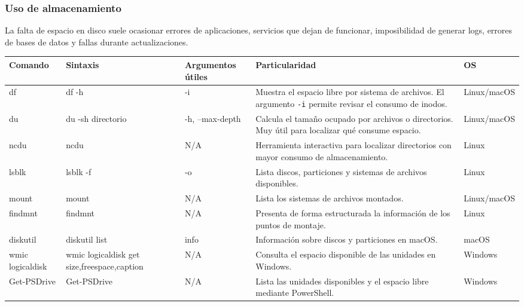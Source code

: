 \documentclass[a4paper,10pt]{article}
\begin{document}

\subsubsection{Uso de almacenamiento}

La falta de espacio en disco suele ocasionar errores de aplicaciones,
servicios que dejan de funcionar, imposibilidad de generar logs,
errores de bases de datos y fallas durante actualizaciones.

\begin{longtable}{|p{2.8cm}|p{3cm}|p{4cm}|p{5.6cm}|p{1.5cm}|}

\hline
Comando &
Sintaxis &
Argumentos útiles &
Particularidad &
OS
\\
\hline
\endhead

df &
df -h &
-i &
Muestra el espacio libre por sistema de archivos. El argumento \texttt{-i} permite revisar el consumo de inodos. &
Linux/macOS
\\
\hline

du &
du -sh directorio &
-h, --max-depth &
Calcula el tamaño ocupado por archivos o directorios. Muy útil para localizar qué consume espacio. &
Linux/macOS
\\
\hline

ncdu &
ncdu &
N/A &
Herramienta interactiva para localizar directorios con mayor consumo de almacenamiento. &
Linux
\\
\hline

lsblk &
lsblk -f &
-o &
Lista discos, particiones y sistemas de archivos disponibles. &
Linux
\\
\hline

mount &
mount &
N/A &
Lista los sistemas de archivos montados. &
Linux/macOS
\\
\hline

findmnt &
findmnt &
N/A &
Presenta de forma estructurada la información de los puntos de montaje. &
Linux
\\
\hline

diskutil &
diskutil list &
info &
Información sobre discos y particiones en macOS. &
macOS
\\
\hline

wmic logicaldisk &
wmic logicaldisk get size,freespace,caption &
N/A &
Consulta el espacio disponible de las unidades en Windows. &
Windows
\\
\hline

Get-PSDrive &
Get-PSDrive &
N/A &
Lista las unidades disponibles y el espacio libre mediante PowerShell. &
Windows
\\
\hline

\end{longtable}
\end{document}
